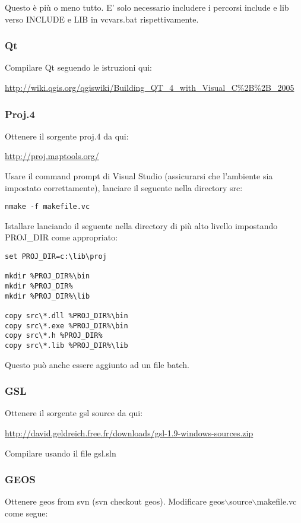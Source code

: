 Questo è più o meno tutto. E' solo necessario includere i percorsi include e lib verso INCLUDE e LIB in vcvars.bat rispettivamente.

\subsubsection{Qt}
Compilare Qt seguendo le istruzioni qui:

\url{http://wiki.qgis.org/qgiswiki/Building\_QT\_4\_with\_Visual\_C\%2B\%2B\_2005}

\subsubsection{Proj.4}
Ottenere il sorgente proj.4 da qui:

\url{http://proj.maptools.org/}

Usare il command prompt di Visual Studio (assicurarsi che l'ambiente sia impostato correttamente), lanciare il seguente nella directory src:

\begin{verbatim}
nmake -f makefile.vc
\end{verbatim}

Istallare lanciando il seguente nella directory di più alto livello impostando PROJ\_DIR come appropriato:

\begin{verbatim}
set PROJ_DIR=c:\lib\proj

mkdir %PROJ_DIR%\bin
mkdir %PROJ_DIR%
mkdir %PROJ_DIR%\lib

copy src\*.dll %PROJ_DIR%\bin
copy src\*.exe %PROJ_DIR%\bin
copy src\*.h %PROJ_DIR%
copy src\*.lib %PROJ_DIR%\lib 
\end{verbatim}

Questo può anche essere aggiunto ad un file batch.

\subsubsection{GSL}
Ottenere il sorgente gsl source da qui:

\url{http://david.geldreich.free.fr/downloads/gsl-1.9-windows-sources.zip}

Compilare usando il file gsl.sln

\subsubsection{GEOS}
Ottenere geos from svn (svn checkout  geos).
Modificare geos$\backslash$source$\backslash$makefile.vc come segue:

